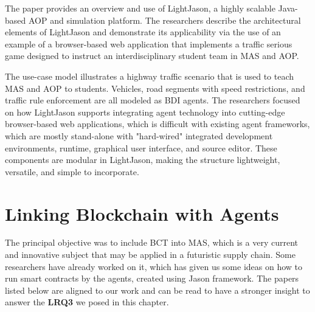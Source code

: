 \begin{itemize}[label={}]
The paper \cite{lightjason} provides an overview and use of LightJason, a highly scalable Java-based \ac{AOP} and simulation platform. The researchers describe the architectural elements of LightJason and demonstrate its applicability via the use of an example of a browser-based web application that implements a traffic serious game designed to instruct an interdisciplinary student team in \ac{MAS} and \ac{AOP}.

\vspace{.5cm}

The use-case model illustrates a highway traffic scenario that is used to teach \ac{MAS} and \ac{AOP} to students. Vehicles, road segments with speed restrictions, and traffic rule enforcement are all modeled as \ac{BDI} agents. The researchers focused on how LightJason supports integrating agent technology into cutting-edge browser-based web applications, which is difficult with existing agent frameworks, which are mostly stand-alone with "hard-wired" integrated development environments, runtime, graphical user interface, and source editor. These components are modular in LightJason, making the structure lightweight, versatile, and simple to incorporate.

\end{itemize}


\section{Linking Blockchain with Agents}

The principal objective was to include \ac{BCT} into \ac{MAS}, which is a very current and innovative subject that may be applied in a futuristic supply chain. Some researchers have already worked on it, which has given us some ideas on how to run smart contracts by the agents, created using Jason framework. The papers listed below are aligned to our work and can be read to have a stronger insight to answer the \textbf{LRQ3} we posed in this chapter.

